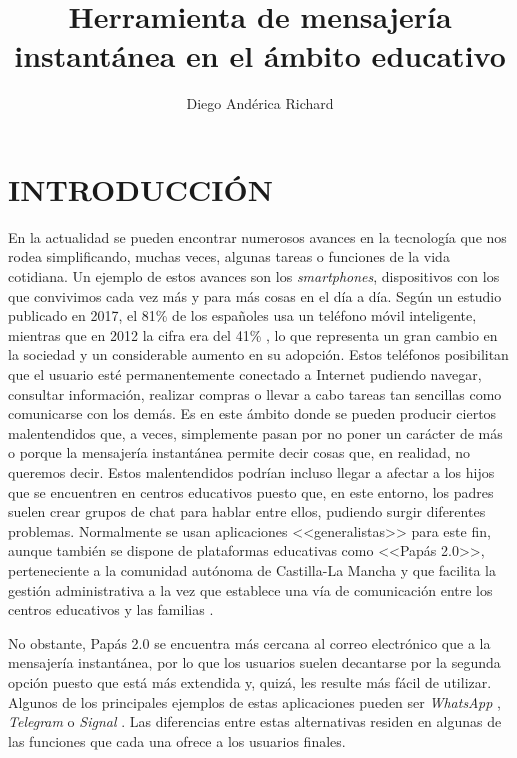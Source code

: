 \documentclass{pre-tfg}
\title{Herramienta de mensajería instantánea en el ámbito educativo}
\author{Diego Andérica Richard}
\begin{document}
	
\renewcommand{\tablename}{Tabla}

\maketitle
\tableofcontents

\newpage

\section{INTRODUCCIÓN}

En la actualidad se pueden encontrar numerosos avances en la tecnología que nos rodea simplificando, muchas veces, algunas tareas o funciones de la vida cotidiana. Un ejemplo de estos avances son los \textit{smartphones}, dispositivos con los que convivimos cada vez más y para más cosas en el día a día. Según un estudio publicado en 2017, el 81\% de los españoles usa un teléfono móvil inteligente, mientras que en 2012 la cifra era del 41\% \cite{Justo2017}, lo que representa un gran cambio en la sociedad y un considerable aumento en su adopción. Estos teléfonos posibilitan que el usuario esté permanentemente conectado a Internet pudiendo navegar, consultar información, realizar compras o llevar a cabo tareas tan sencillas como comunicarse con los demás. Es en este ámbito donde se pueden producir ciertos malentendidos que, a veces, simplemente pasan por no poner un carácter de más o porque la mensajería instantánea permite decir cosas que, en realidad, no queremos decir. Estos malentendidos podrían incluso llegar a afectar a los hijos que se encuentren en centros educativos puesto que, en este entorno, los padres suelen crear grupos de chat para hablar entre ellos, pudiendo surgir diferentes problemas. Normalmente se usan aplicaciones <<generalistas>> para este fin, aunque también se dispone de plataformas educativas como <<Papás 2.0>>, perteneciente a la comunidad autónoma de Castilla-La Mancha y que facilita la gestión administrativa a la vez que establece una vía de comunicación entre los centros educativos y las familias \cite{JCCM2017}.

No obstante, Papás 2.0 se encuentra más cercana al correo electrónico que a la mensajería instantánea, por lo que los usuarios suelen decantarse por la segunda opción puesto que está más extendida y, quizá, les resulte más fácil de utilizar. Algunos de los principales ejemplos de estas aplicaciones pueden ser \textit{WhatsApp} \cite{WhatsApp}, \textit{Telegram} \cite{Telegram2017} o \textit{Signal} \cite{Signal}. Las diferencias entre estas alternativas residen en algunas de las funciones que cada una ofrece a los usuarios finales.
\end{document}
